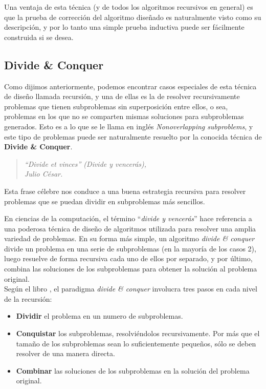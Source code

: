 Una ventaja de esta técnica (y de todos los algoritmos recursivos en general) es que la prueba de corrección del algoritmo diseñado es
naturalmente visto como su descripción, y por lo tanto una simple prueba inductiva puede ser fácilmente construida si se
desea\cite{alsuwaiyel98}.


\subsection{Divide \& Conquer} \label{divideandconquer}

Como dijimos anteriormente, podemos encontrar casos especiales de esta técnica de diseño llamada recursión, y una de ellas es la de resolver
recursivamente problemas que tienen subproblemas sin superposición entre ellos, o sea, problemas en los que no se comparten mismas
soluciones para subproblemas generados. Esto es a lo que se le llama en inglés \textit{Nonoverlapping subproblems}, y este tipo de problemas
puede ser naturalmente resuelto por la conocida técnica de \textbf{Divide \& Conquer}\cite{levitin06}.

\begin{quote}
    \begin{flushright}
        \textit{``Divide et vinces'' (Divide y vencerás),\\Julio César.}
    \end{flushright}
\end{quote}

Esta frase célebre nos conduce a una buena estrategia recursiva para resolver problemas que se puedan dividir en subproblemas más
sencillos.

En ciencias de la computación, el término ``\textit{divide y vencerás}'' hace referencia a una poderosa técnica de diseño de
algoritmos utilizada para resolver una amplia variedad de problemas. En su forma más simple, un algoritmo \textit{divide \& conquer} divide
un problema en una serie de subproblemas (en la mayoría de los casos 2), luego resuelve de forma recursiva cada uno de ellos por separado, y
por último, combina las soluciones de los subproblemas para obtener la solución al problema original\cite{alsuwaiyel98}.\\

Según el libro \cite{cormen09}, el paradigma \textit{divide \& conquer} involucra tres pasos en cada nivel de la recursión:
\begin{itemize}
    \item   \textbf{Dividir} el problema en un numero de subproblemas.
    \item   \textbf{Conquistar} los subproblemas, resolviéndolos recursivamente. Por más que el tamaño de los subproblemas sean lo
            suficientemente pequeños, sólo se deben resolver de una manera directa.
    \item   \textbf{Combinar} las soluciones de los subproblemas en la solución del problema original.\\
\end{itemize}

